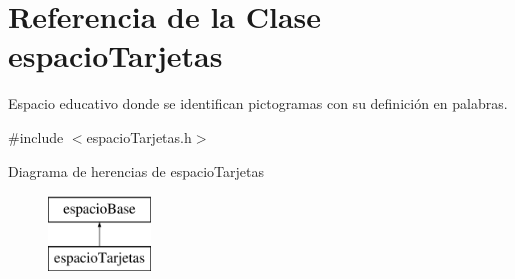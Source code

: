 \hypertarget{classespacio_tarjetas}{}\section{Referencia de la Clase espacio\+Tarjetas}
\label{classespacio_tarjetas}


Espacio educativo donde se identifican pictogramas con su definición en palabras.  




{\ttfamily \#include $<$espacio\+Tarjetas.\+h$>$}

Diagrama de herencias de espacio\+Tarjetas\begin{figure}[H]
\begin{center}
\leavevmode
\includegraphics[height=2.000000cm]{classespacio_tarjetas}
\end{center}
\end{figure}
